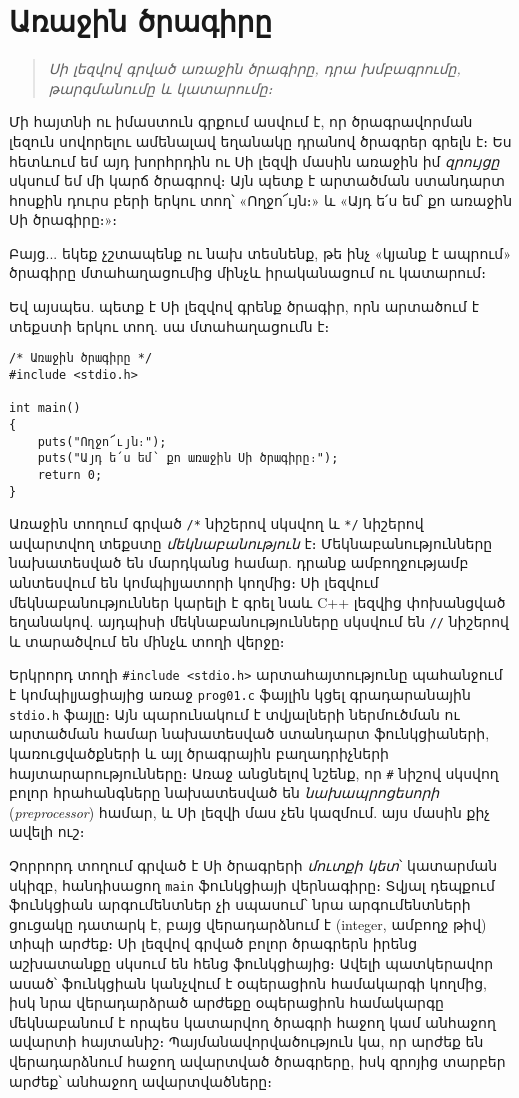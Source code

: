 \chapter{Առաջին ծրագիրը}

\begin{quote}
\emph{Սի լեզվով գրված առաջին ծրագիրը, դրա խմբագրումը,
թարգմանումը և կատարումը։}
\end{quote}

Մի հայտնի ու իմաստուն գրքում \cite{krc} ասվում է, որ ծրագրավորման
լեզուն սովորելու ամենալավ եղանակը դրանով ծրագրեր գրելն է։ Ես հետևում
եմ այդ խորհրդին ու Սի լեզվի մասին առաջին իմ \emph{զրույցը} սկսում
եմ մի կարճ ծրագրով։ Այն պետք է արտածման ստանդարտ հոսքին դուրս բերի
երկու տող՝ «Ողջո՜ւյն։» և «Այդ ե՛ս եմ՝ քո առաջին Սի ծրագիրը։»։

Բայց... եկեք չշտապենք ու նախ տեսնենք, թե ինչ «կյանք է ապրում»
ծրագիրը մտահաղացումից մինչև իրականացում ու կատարում։

Եվ այսպես. պետք է Սի լեզվով գրենք ծրագիր, որն արտածում է տեքստի
երկու տող. սա մտահաղացումն է։

\begin{Verbatim}
/* Առաջին ծրագիրը */
#include <stdio.h>

int main()
{
    puts("Ողջո՜ւյն։");
    puts("Այդ ե՛ս եմ՝ քո առաջին Սի ծրագիրը։");
    return 0;
}
\end{Verbatim}

Առաջին տողում գրված \Verb|/*| նիշերով սկսվող և \Verb|*/| նիշերով
ավարտվող տեքստը \emph{մեկնաբանություն} է։ Մեկնաբանությունները
նախատեսված են մարդկանց համար. դրանք ամբողջությամբ անտեսվում են
կոմպիլյատորի կողմից։ Սի լեզվում մեկնաբանություններ կարելի է գրել
նաև C++ լեզվից փոխանցված եղանակով. այդպիսի մեկնաբանությունները
սկսվում են \Verb|//| նիշերով և տարածվում են մինչև տողի վերջը։

Երկրորդ տողի \Verb|#include <stdio.h>| արտահայտությունը պահանջում
է կոմ\-պիլյացիայից առաջ \texttt{prog01.c} ֆայլին կցել գրադարանային
\texttt{stdio.h} ֆայլը։ Այն պարունակում է տվյալների ներմուծման ու
արտածման համար նախատեսված ստանդարտ ֆունկցիաների, կառուցվածքների և
այլ ծրագրային բաղադրիչների հայտարարությունները։ Առաջ անցնելով
նշենք, որ \Verb|#| նիշով սկսվող բոլոր հրահանգները նախատեսված են
\emph{նախապրոցեսորի} (\emph{preprocessor}) համար, և Սի լեզվի մաս
չեն կազմում. այս մասին քիչ ավելի ուշ։

Չորրորդ տողում գրված է Սի ծրագրերի \emph{մուտքի կետ}՝ կատարման
սկիզբ, հանդիսացող \texttt{main} ֆունկցիայի վերնագիրը։ Տվյալ
դեպքում  ֆունկցիան արգումենտներ չի սպասում՝ նրա
արգումենտների ցուցակը դատարկ է, բայց վերադարձնում է 
(integer, ամբողջ թիվ) տիպի արժեք։ Սի լեզվով գրված բոլոր ծրագրերն
իրենց աշխատանքը սկսում են հենց  ֆունկցիայից։ Ավելի
պատկերավոր ասած՝  ֆունկցիան կանչվում է օպերացիոն
համակարգի կողմից, իսկ նրա վերադարձրած արժեքը օպերացիոն համակարգը
մեկնաբանում է որպես կատարվող ծրագրի հաջող կամ անհաջող ավարտի
հայտանիշ։ Պայ\-մանավորվածություն կա, որ  արժեք են
վերադարձնում հաջող ավարտված ծրագրերը, իսկ զրոյից տարբեր արժեք՝
անհաջող ավարտվածները։

